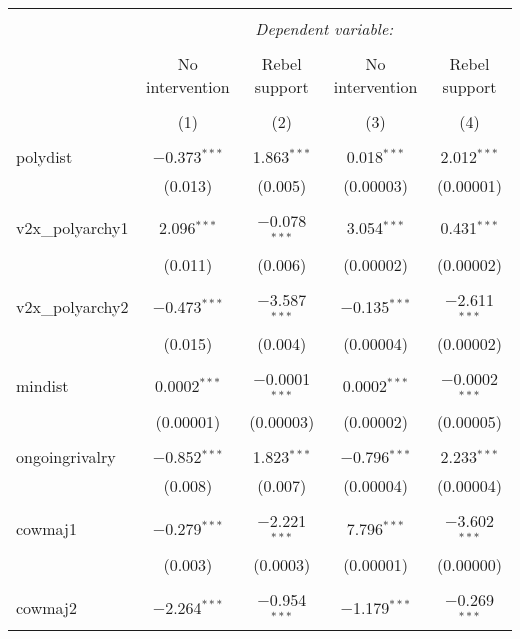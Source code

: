 
\begin{table}[!htbp] \centering 
  \caption{} 
  \label{} 
\begin{tabular}{@{\extracolsep{5pt}}lcccc} 
\\[-1.8ex]\hline 
\hline \\[-1.8ex] 
 & \multicolumn{4}{c}{\textit{Dependent variable:}} \\ 
\cline{2-5} 
\\[-1.8ex] & No intervention & Rebel support & No intervention & Rebel support \\ 
\\[-1.8ex] & (1) & (2) & (3) & (4)\\ 
\hline \\[-1.8ex] 
 polydist & $-$0.373$^{***}$ & 1.863$^{***}$ & 0.018$^{***}$ & 2.012$^{***}$ \\ 
  & (0.013) & (0.005) & (0.00003) & (0.00001) \\ 
  & & & & \\ 
 v2x\_polyarchy1 & 2.096$^{***}$ & $-$0.078$^{***}$ & 3.054$^{***}$ & 0.431$^{***}$ \\ 
  & (0.011) & (0.006) & (0.00002) & (0.00002) \\ 
  & & & & \\ 
 v2x\_polyarchy2 & $-$0.473$^{***}$ & $-$3.587$^{***}$ & $-$0.135$^{***}$ & $-$2.611$^{***}$ \\ 
  & (0.015) & (0.004) & (0.00004) & (0.00002) \\ 
  & & & & \\ 
 mindist & 0.0002$^{***}$ & $-$0.0001$^{***}$ & 0.0002$^{***}$ & $-$0.0002$^{***}$ \\ 
  & (0.00001) & (0.00003) & (0.00002) & (0.00005) \\ 
  & & & & \\ 
 ongoingrivalry & $-$0.852$^{***}$ & 1.823$^{***}$ & $-$0.796$^{***}$ & 2.233$^{***}$ \\ 
  & (0.008) & (0.007) & (0.00004) & (0.00004) \\ 
  & & & & \\ 
 cowmaj1 & $-$0.279$^{***}$ & $-$2.221$^{***}$ & 7.796$^{***}$ & $-$3.602$^{***}$ \\ 
  & (0.003) & (0.0003) & (0.00001) & (0.00000) \\ 
  & & & & \\ 
 cowmaj2 & $-$2.264$^{***}$ & $-$0.954$^{***}$ & $-$1.179$^{***}$ & $-$0.269$^{***}$ \\ 

\end{tabular}
\end{table}
